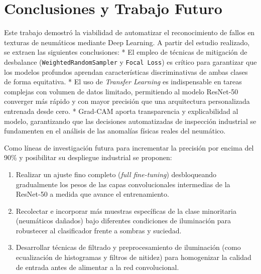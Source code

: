 \documentclass{article}
\begin{document}
\section{Conclusiones y Trabajo Futuro}
Este trabajo demostró la viabilidad de automatizar el reconocimiento de fallos en texturas de neumáticos mediante Deep Learning. A partir del estudio realizado, se extraen las siguientes conclusiones:
*   El empleo de técnicas de mitigación de desbalance (\texttt{WeightedRandomSampler} y \texttt{Focal Loss}) es crítico para garantizar que los modelos profundos aprendan características discriminativas de ambas clases de forma equitativa.
*   El uso de \textit{Transfer Learning} es indispensable en tareas complejas con volumen de datos limitado, permitiendo al modelo ResNet-50 converger más rápido y con mayor precisión que una arquitectura personalizada entrenada desde cero.
*   Grad-CAM aporta transparencia y explicabilidad al modelo, garantizando que las decisiones automatizadas de inspección industrial se fundamenten en el análisis de las anomalías físicas reales del neumático.

Como líneas de investigación futura para incrementar la precisión por encima del 90\% y posibilitar su despliegue industrial se proponen:
\begin{enumerate}
    \item Realizar un ajuste fino completo (\textit{full fine-tuning}) desbloqueando gradualmente los pesos de las capas convolucionales intermedias de la ResNet-50 a medida que avance el entrenamiento.
    \item Recolectar e incorporar más muestras específicas de la clase minoritaria (neumáticos dañados) bajo diferentes condiciones de iluminación para robustecer al clasificador frente a sombras y suciedad.
    \item Desarrollar técnicas de filtrado y preprocesamiento de iluminación (como ecualización de histogramas y filtros de nitidez) para homogenizar la calidad de entrada antes de alimentar a la red convolucional.
\end{enumerate}
\end{document}
